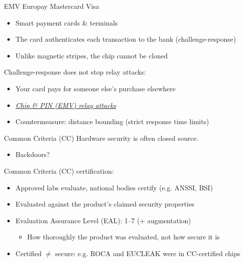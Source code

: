 \begin{frame}{EMV}
  Europay Mastercard Visa
  \begin{itemize}[<+(1)->]
    \item Smart payment cards \& terminals
    \item The card authenticates each transaction to the bank (challenge-response)
    \item Unlike magnetic stripes, the chip cannot be cloned
  \end{itemize}

  \vspace*{1em}

  \pause
  Challenge-response does not stop relay attacks:
  \begin{itemize}[<+(1)->]
    \item Your card pays for someone else's purchase elsewhere
    \item \href{https://www.cl.cam.ac.uk/research/security/banking/relay/}{\textit{Chip \& PIN (EMV) relay attacks}}
    \item Countermeasure: distance bounding (strict response time limits)
  \end{itemize}
\end{frame}

\begin{frame}{Common Criteria (CC)}
  Hardware security is often closed source.
  \begin{itemize}[<+(1)->]
    \item Backdoors?
  \end{itemize}

  \vspace*{1em}

  \pause
  Common Criteria (CC) certification:
  \begin{itemize}[<+(1)->]
    \item Approved labs evaluate, national bodies certify (e.g. ANSSI, BSI)
    \item Evaluated against the product's claimed security properties
    \item Evaluation Assurance Level (EAL): 1--7 (+ augmentation)
    \par
    \begin{itemize}
      \item How thoroughly the product was evaluated, not how secure it is
    \end{itemize}
    \item Certified $\neq$ secure: e.g. ROCA and EUCLEAK were in CC-certified chips
  \end{itemize}
\end{frame}

